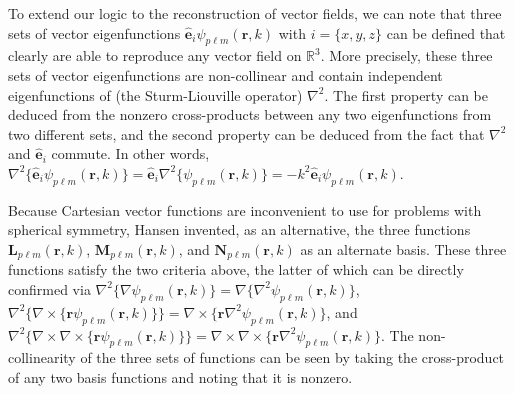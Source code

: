 To extend our logic to the reconstruction of vector fields, we can note that three sets of vector eigenfunctions $\hat{\mathbf{e}}_i\psi_{p\ell m}(\mathbf{r},k)$ with $i = \{x,y,z\}$ can be defined that clearly are able to reproduce any vector field on $\mathbb{R}^3$. More precisely, these three sets of vector eigenfunctions are non-collinear\cite{stratton1941electromagnetic} and contain independent eigenfunctions of (the Sturm-Liouville operator) $\nabla^2$. The first property can be deduced from the nonzero cross-products between any two eigenfunctions from two different sets, and the second property can be deduced from the fact that $\nabla^2$ and $\hat{\mathbf{e}}_i$ commute. In other words, $\nabla^2\{\hat{\mathbf{e}}_i\psi_{p\ell m}(\mathbf{r},k)\} = \hat{\mathbf{e}}_i\nabla^2\{\psi_{p\ell m}(\mathbf{r},k)\} = -k^2\hat{\mathbf{e}}_i\psi_{p\ell m}(\mathbf{r},k)$.

Because Cartesian vector functions are inconvenient to use for problems with spherical symmetry, Hansen\cite{hansen1935new} invented, as an alternative, the three functions $\mathbf{L}_{p\ell m}(\mathbf{r},k)$, $\mathbf{M}_{p\ell m}(\mathbf{r},k)$, and $\mathbf{N}_{p\ell m}(\mathbf{r},k)$ as an alternate basis. These three functions satisfy the two criteria above, the latter of which can be directly confirmed via $\nabla^2\{\nabla\psi_{p\ell m}(\mathbf{r},k)\} = \nabla\{\nabla^2\psi_{p\ell m}(\mathbf{r},k)\}$, $\nabla^2\{\nabla\times\{\mathbf{r}\psi_{p\ell m}(\mathbf{r},k)\}\} = \nabla\times\{\mathbf{r}\nabla^2\psi_{p\ell m}(\mathbf{r},k)\}$, and $\nabla^2\{\nabla\times\nabla\times\{\mathbf{r}\psi_{p\ell m}(\mathbf{r},k)\}\} = \nabla\times\nabla\times\{\mathbf{r}\nabla^2\psi_{p\ell m}(\mathbf{r},k)\}$. The non-collinearity of the three sets of functions can be seen by taking the cross-product of any two basis functions and noting that it is nonzero. 

